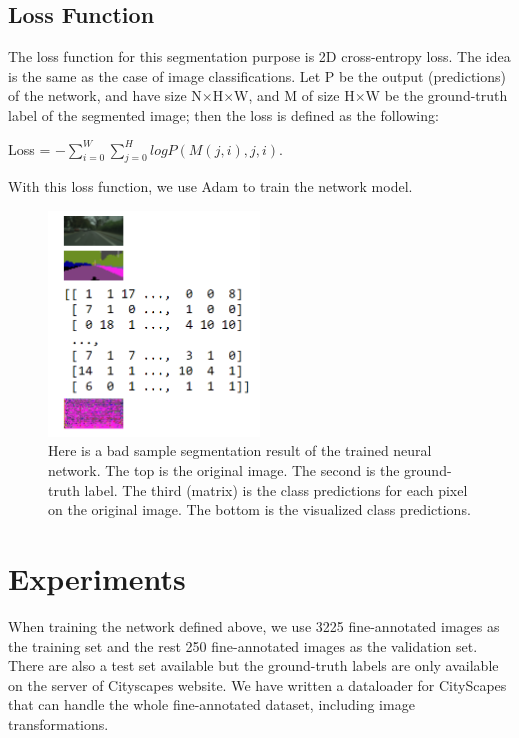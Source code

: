 \documentclass[10pt,twocolumn,letterpaper]{article}
\begin{document}
\subsection{Loss Function}
The loss function for this segmentation purpose is 2D cross-entropy loss. The idea is the same as the case of image classifications. Let P be the output (predictions) of the network, and have size N$\times$H$\times$W, and M of size H$\times$W be the ground-truth label of the segmented image; then the loss is defined as the following:
\begin{center}
	Loss = $-\sum_{i=0}^{W}\sum_{j=0}^{H}logP(M(j,i),j,i)$.
\end{center}
With this loss function, we use Adam to train the network model.

\begin{figure}[t]
	\centering
	\includegraphics[width=0.50\textwidth]{bad_result.PNG}
	\caption{Here is a bad sample segmentation result of the trained neural network. The top is the original image. The second is the ground-truth label. The third (matrix) is the class predictions for each pixel on the original image. The bottom is the visualized class predictions.}
	\label{fig:leadfigure}
\end{figure}

\section{Experiments}
When training the network defined above, we use 3225 fine-annotated images as the training set and the rest 250 fine-annotated images as the validation set. There are also a test set available but the ground-truth labels are only available on the server of Cityscapes website. We have written a dataloader for CityScapes that can handle the whole fine-annotated dataset, including image transformations.
\end{document}
